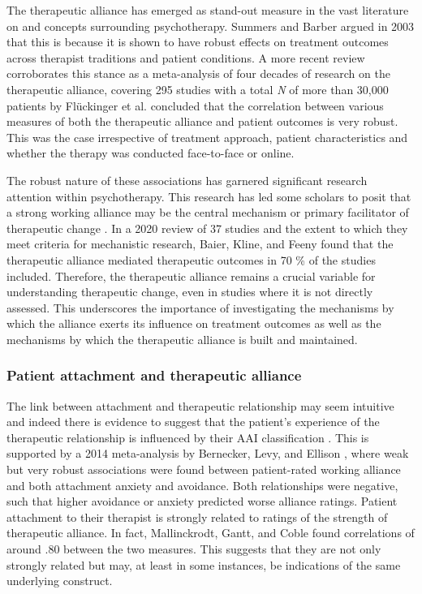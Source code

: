 \documentclass[12pt]{report}
\begin{document}
The therapeutic alliance has emerged as stand-out measure in the vast literature on and concepts surrounding psychotherapy. Summers and Barber \cite{Summers2003} argued in 2003 that this is because it is shown to have robust effects on treatment outcomes across therapist traditions and patient conditions.
A more recent review corroborates this stance as a meta-analysis of four decades of research on the therapeutic alliance, covering 295 studies with a total \textit{N} of more than 30,000 patients by Flückinger et al. \cite{Fluckinger2018} concluded that the correlation between various measures of both the therapeutic alliance and patient outcomes is very robust.
This was the case irrespective of treatment approach, patient characteristics and whether the therapy was conducted face-to-face or online.

The robust nature of these associations has garnered significant research attention within psychotherapy. This research has led some scholars to posit that a strong working alliance may be the central mechanism or primary facilitator of therapeutic change \cite{RodgersCailholBuiEtAl2010}.
In a 2020 review of 37 studies and the extent to which they meet criteria for mechanistic research, Baier, Kline, and Feeny \cite{Baier2020} found that the therapeutic alliance mediated therapeutic outcomes in 70 \% of the studies included.
Therefore, the therapeutic alliance remains a crucial variable for understanding therapeutic change, even in studies where it is not directly assessed.  This underscores the importance of investigating the mechanisms by which the alliance exerts its influence on treatment outcomes as well as the mechanisms by which the therapeutic alliance is built and maintained.

\subsubsection*{Patient attachment and therapeutic alliance}
The link between attachment and therapeutic relationship may seem intuitive and indeed there is evidence to suggest that the patient's experience of the therapeutic relationship is influenced by their AAI classification \cite{Talia2019}.
This is supported by a 2014 meta-analysis by Bernecker, Levy, and Ellison \cite{Bernecker2014}, where weak but very robust associations were found between patient-rated working alliance and both attachment anxiety and avoidance. Both relationships were negative, such that higher avoidance or anxiety predicted worse alliance ratings.
Patient attachment to their therapist is strongly related to ratings of the strength of therapeutic alliance. In fact, Mallinckrodt, Gantt, and Coble \cite{Mallinckrodt1995} found correlations of around .80 between the two measures. This suggests that they are not only strongly related but may, at least in some instances, be indications of the same underlying construct.
\end{document}
